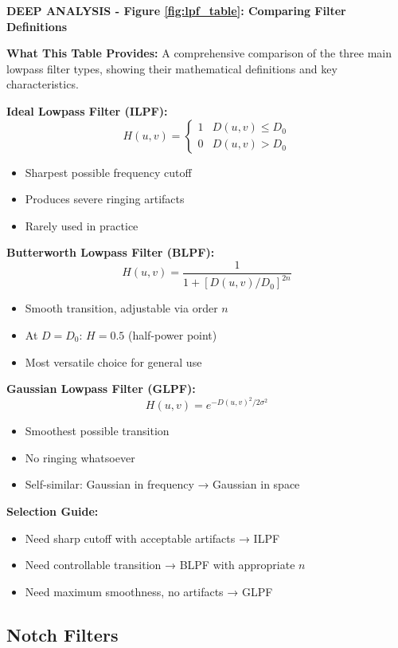 \documentclass[12pt,a4paper]{article}
\begin{document}
\begin{deepexplanation}
\textbf{DEEP ANALYSIS - Figure \ref{fig:lpf_table}: Comparing Filter Definitions}

\textbf{What This Table Provides:}
A comprehensive comparison of the three main lowpass filter types, showing their mathematical definitions and key characteristics.

\textbf{Ideal Lowpass Filter (ILPF):}
\[
H(u, v) = \begin{cases} 1 & D(u, v) \leq D_0 \\ 0 & D(u, v) > D_0 \end{cases}
\]
\begin{itemize}
    \item Sharpest possible frequency cutoff
    \item Produces severe ringing artifacts
    \item Rarely used in practice
\end{itemize}

\textbf{Butterworth Lowpass Filter (BLPF):}
\[
H(u, v) = \frac{1}{1 + [D(u, v)/D_0]^{2n}}
\]
\begin{itemize}
    \item Smooth transition, adjustable via order $n$
    \item At $D = D_0$: $H = 0.5$ (half-power point)
    \item Most versatile choice for general use
\end{itemize}

\textbf{Gaussian Lowpass Filter (GLPF):}
\[
H(u, v) = e^{-D(u, v)^2 / 2\sigma^2}
\]
\begin{itemize}
    \item Smoothest possible transition
    \item No ringing whatsoever
    \item Self-similar: Gaussian in frequency → Gaussian in space
\end{itemize}

\textbf{Selection Guide:}
\begin{itemize}
    \item Need sharp cutoff with acceptable artifacts → ILPF
    \item Need controllable transition → BLPF with appropriate $n$
    \item Need maximum smoothness, no artifacts → GLPF
\end{itemize}
\end{deepexplanation}

\subsection{Notch Filters}
\end{document}
